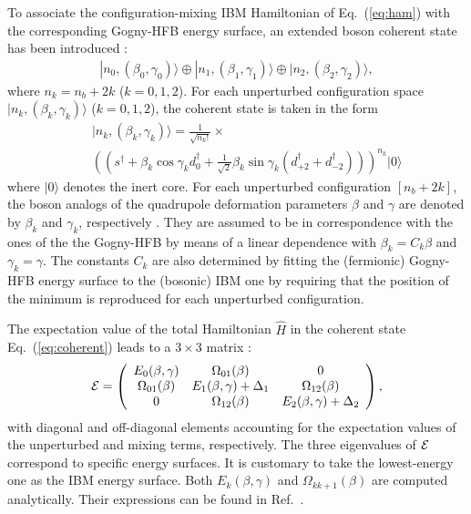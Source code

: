 \documentclass[twocolumn,showpacs,amsmath,amssymb,superscriptaddress]{revtex4-1}
\begin{document}
To associate the configuration-mixing IBM Hamiltonian of Eq.~(\ref{eq:ham})
with the corresponding Gogny-HFB energy surface, an extended 
boson coherent state has been introduced \cite{frank04}: 
\begin{eqnarray}
\label{eq:coherent}
|n_0,(\beta_0,\gamma_0)\rangle\oplus
|n_1,(\beta_1,\gamma_1)\rangle\oplus |n_2,(\beta_2,\gamma_2)\rangle, 
\end{eqnarray}
where $n_k=n_b+2k$ ($k=0,1,2$). For each unperturbed configuration 
space $|n_k,(\beta_k,\gamma_k)\rangle$ ($k=0,1,2$), the coherent state 
is taken in the form
\begin{eqnarray}
\label{eq:coherent-unp}
&&|n_k,(\beta_k,\gamma_k)\rangle=\frac{1}{\sqrt{n_{k}!}}\times \nonumber \\
&&(
(s^{\dagger}+\beta_k\cos{\gamma_k}d^{\dagger}_0+\frac{1}{\sqrt{2}}\beta_k\sin{\gamma_k
}(d^{\dagger}_{+2}+d^{\dagger}_{-2})
)
)^{n_k}|0\rangle
\end{eqnarray}
where $|0\rangle$ denotes the inert core. For each unperturbed 
configuration $[n_b+2k]$, the boson analogs of the quadrupole 
deformation parameters $\beta$ and $\gamma$ are denoted by $\beta_k$ 
and $\gamma_k$, respectively \cite{BM}. They are assumed to be in 
correspondence with the ones of the the Gogny-HFB by means of a linear 
dependence with $\beta_k=C_k\beta$ and $\gamma_k=\gamma$. The constants  
$C_k$ are  also determined  by fitting  the (fermionic) Gogny-HFB 
energy surface to the (bosonic) IBM one by requiring  that the position 
of the minimum is reproduced for each unperturbed configuration. 



The expectation value of the total Hamiltonian $\hat H$ in the coherent 
state Eq.~(\ref{eq:coherent}) leads to a $3\times 3$ matrix \cite{frank04}: 
\begin{eqnarray}
\label{eq:pes}
  {\cal E}=\left(
\begin{array}{ccc}
E_{0}(\beta,\gamma) & \Omega_{01}(\beta) & 0 \\
\Omega_{01}(\beta) & E_{1}(\beta,\gamma)+\Delta_{1} & \Omega_{12}(\beta) \\
0 & \Omega_{12}(\beta) & E_{2}(\beta,\gamma)+\Delta_{2} \\
\end{array}
\right), %
\end{eqnarray}
with diagonal and off-diagonal elements accounting for the expectation 
values of the unperturbed and mixing terms, respectively. The three 
eigenvalues of ${\cal E}$ correspond to specific energy surfaces. It is 
customary to take the lowest-energy one \cite{frank04} as the IBM 
energy surface. Both $E_k(\beta,\gamma)$ and $\Omega_{kk+1}(\beta)$ are 
computed analytically. Their  expressions can be  found in 
Ref.~\cite{nomura2017ge}. 
\end{document}
